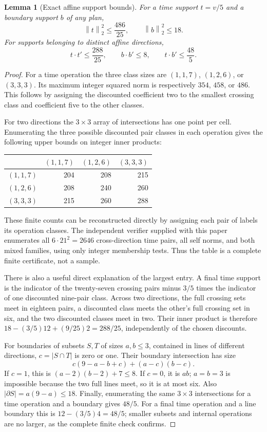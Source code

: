 \documentclass[11pt]{article}
\newtheorem{lemma}[theorem]{Lemma}
\theoremstyle{definition}\newtheorem{definition}[theorem]{Definition}
\theoremstyle{remark}\newtheorem{remark}[theorem]{Remark}
\newcommand{\norm}[1]{\left\lVert#1\right\rVert_2}
\begin{document}
\begin{lemma}[Exact affine support bounds]\label{lem:affinebounds}
For a time support $t=v/5$ and a boundary support $b$ of any plan,
\[
 \norm t^2\le\frac{486}{25},\qquad \norm b^2\le18.
\]
For supports belonging to distinct affine directions,
\begin{equation}\label{eq:crossbounds}
 t\cdot t'\le\frac{288}{25},\qquad
 b\cdot b'\le8,\qquad t\cdot b'\le\frac{48}{5}.
\end{equation}
\end{lemma}
\begin{proof}
For a time operation the three class sizes are $(1,1,7)$, $(1,2,6)$, or
$(3,3,3)$. Its maximum integer squared norm is respectively $354$, $458$,
or $486$. This follows by assigning the discounted coefficient two to
the smallest crossing class and coefficient five to the other classes.

For two directions the $3\times3$ array of intersections has one point
per cell. Enumerating the three possible discounted pair classes in each
operation gives the following upper bounds on integer inner products:
\begin{center}
\begin{tabular}{c|rrr}
 & $(1,1,7)$ & $(1,2,6)$ & $(3,3,3)$\\\hline
$(1,1,7)$&204&208&215\\
$(1,2,6)$&208&240&260\\
$(3,3,3)$&215&260&288
\end{tabular}
\end{center}
These finite counts can be reconstructed directly by assigning each pair
of labels its operation classes. The independent verifier supplied with
this paper enumerates all $6\cdot21^2=2646$ cross-direction time pairs,
all self norms, and both mixed families, using only integer membership
tests. Thus the table is a complete finite certificate, not a sample.

There is also a useful direct explanation of the largest entry. A final
time support is the indicator of the twenty-seven crossing pairs minus
$3/5$ times the indicator of one discounted nine-pair class. Across two
directions, the full crossing sets meet in eighteen pairs, a discounted
class meets the other's full crossing set in six, and the two discounted
classes meet in two. Their inner product is therefore
$18-(3/5)12+(9/25)2=288/25$, independently of the chosen discounts.

For boundaries of subsets $S,T$ of sizes $a,b\le3$, contained in lines of
different directions, $c=|S\cap T|$ is zero or one. Their boundary
intersection has size
\[
 c(9-a-b+c)+(a-c)(b-c).
\]
If $c=1$, this is $(a-2)(b-2)+7\le8$. If $c=0$, it is $ab$; $a=b=3$
is impossible because the two full lines meet, so it is at most six.
Also $|\partial S|=a(9-a)\le18$.
Finally, enumerating the same $3\times3$ intersections for a time
operation and a boundary gives $48/5$. For a final time operation and a
line boundary this is $12-(3/5)4=48/5$; smaller subsets and internal
operations are no larger, as the complete finite check confirms.
\end{proof}
\end{document}
